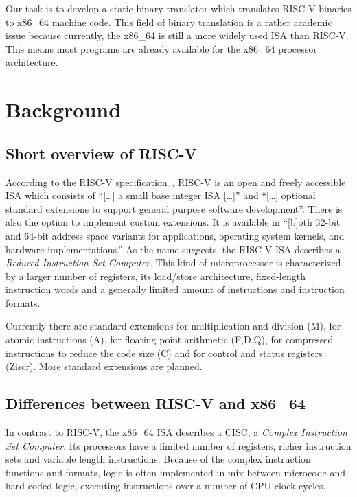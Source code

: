 \documentclass[course=eragp]{aspdoc}
\begin{document}
\par


\par

Our task is to
develop a static binary translator which translates RISC-V binaries to x86\_64 machine code. This
field of binary translation is a rather academic issue because currently, the x86\_64 is still a
more widely used ISA than RISC-V.\cite{riscv_rises} This means most programs are already available for the x86\_64
processor architecture.

\section{Background}
\subsection{Short overview of RISC-V}

According to the RISC-V specification~\cite{rvspec}, RISC-V is an open and freely accessible ISA
which consists of ``[\ldots] a small base integer ISA [\ldots]'' and ``[\ldots] optional standard
extensions to support general purpose software development''\cite[p.~1]{rvspec}. There is also
the option to implement custom extensions. It is available in
``[b]oth 32-bit and 64-bit address space variants for applications, operating system kernels, and
hardware implementations.''\cite[p.~1]{rvspec} As the name suggests, the RISC-V ISA describes a
\emph{Reduced Instruction Set Computer}. This kind of microprocessor is characterized by a larger
number of registers, its load/store architecture, fixed-length instruction words and a generally
limited amount of instructions and instruction formats.\cite{RISCvCISC}

\par

Currently there are standard extensions for multiplication and division (M), for atomic instructions (A),
for floating point arithmetic (F,D,Q), for compressed instructions to reduce the code size (C) and
for control and status registers (Ziscr). More standard extensions are planned.\cite{rvspec}

\subsection{Differences between RISC-V and x86\_64}
In contrast to RISC-V, the x86\_64 ISA describes a CISC, a \emph{Complex Instruction Set Computer}.
Its processors have a limited number of registers, richer instruction sets and variable length
instructions. Because of the complex instruction functions and formats, logic is often implemented
in mix between microcode and hard coded logic, executing instructions over a number of CPU clock
cycles.\cite{RISCvCISC}
\end{document}
